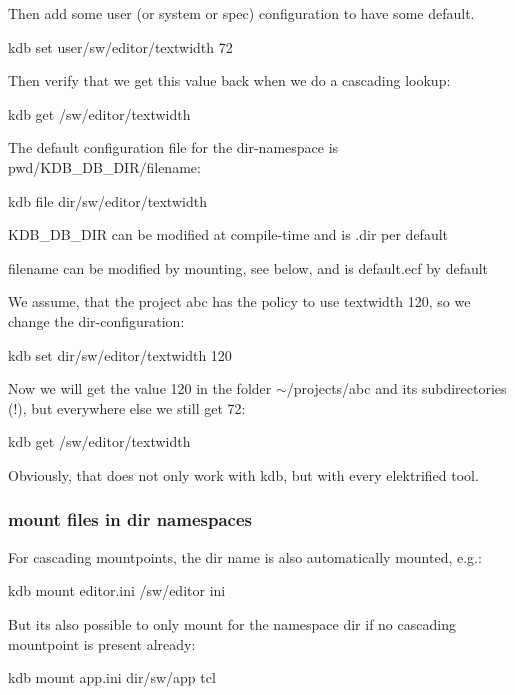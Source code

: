 Then add some user (or system or spec) configuration to have some default. \begin{DoxyVerb}kdb set user/sw/editor/textwidth 72
\end{DoxyVerb}


Then verify that we get this value back when we do a cascading lookup\+: \begin{DoxyVerb}kdb get /sw/editor/textwidth
\end{DoxyVerb}


The default configuration file for the dir-\/namespace is {\ttfamily pwd}/\+K\+D\+B\+\_\+\+D\+B\+\_\+\+D\+I\+R/filename\+: \begin{DoxyVerb}kdb file dir/sw/editor/textwidth
\end{DoxyVerb}



\begin{DoxyItemize}
\item K\+D\+B\+\_\+\+D\+B\+\_\+\+D\+IR can be modified at compile-\/time and is {\ttfamily .dir} per default
\item filename can be modified by mounting, see below, and is {\ttfamily default.\+ecf} by default
\end{DoxyItemize}

We assume, that the project abc has the policy to use textwidth 120, so we change the dir-\/configuration\+: \begin{DoxyVerb}kdb set dir/sw/editor/textwidth 120
\end{DoxyVerb}


Now we will get the value 120 in the folder $\sim$/projects/abc and its subdirectories (!), but everywhere else we still get 72\+: \begin{DoxyVerb}kdb get /sw/editor/textwidth
\end{DoxyVerb}


Obviously, that does not only work with kdb, but with every elektrified tool.

\subsubsection*{mount files in dir namespaces}

For cascading mountpoints, the dir name is also automatically mounted, e.\+g.\+: \begin{DoxyVerb}kdb mount editor.ini /sw/editor ini
\end{DoxyVerb}


But its also possible to only mount for the namespace dir if no cascading mountpoint is present already\+: \begin{DoxyVerb}kdb mount app.ini dir/sw/app tcl
\end{DoxyVerb}


